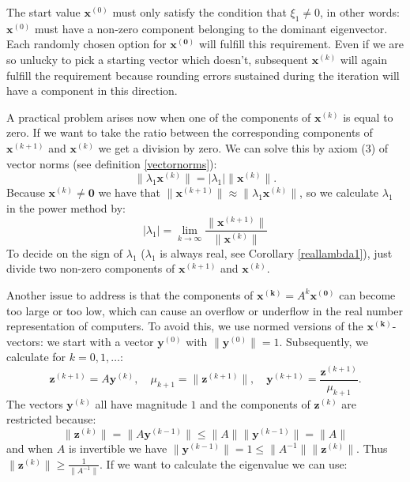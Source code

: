 \documentclass[a4paper,11pt]{report}
\begin{document}
The start value $\mathbf{x}^{(0)}$ must only satisfy the condition that $\xi_1 \not = 
0$, in other words: $\mathbf{x}^{(0)}$ must have a non-zero component belonging to the 
dominant eigenvector. Each randomly chosen option for  $\mathbf{x^{(0)}}$ 
will fulfill this requirement. Even if we are so unlucky to pick a starting 
vector which doesn't, subsequent $\mathbf{x}^{(k)}$ will again fulfill the 
requirement
because rounding errors sustained during the iteration will have a component in 
this direction.

A practical problem arises now when one of the components of $\mathbf{x}^{(k)}$ 
is equal to zero. If we want to take the ratio between the corresponding 
components of $\mathbf{x}^{(k+1)}$ and $\mathbf{x}^{(k)}$ we get a division by 
zero. We can solve this by axiom (3) of vector norms (see definition \ref{vectornorms}): 
$$\|\lambda_1\mathbf{x}^{(k)}\| = |\lambda_1|\|\mathbf{x}^{(k)}\|.$$
Because $\mathbf{x}^{(k)} \not = \mathbf{0}$ we have that $\|\mathbf{x}^{(k+1)}\| \approx \|\lambda_1\mathbf{x}^{(k)}\|$, 
so we calculate
$\lambda_1$ in the power method by:
$$|\lambda_1| = \lim_{k\to\infty}\frac{\|\mathbf{x}^{(k+1)}\|}{\|\mathbf{x}^{(k)}\| }$$
To decide on the sign of $\lambda_1$ ($\lambda_1$ is always real, see Corollary \ref{reallambda1}), just divide two non-zero components of $\mathbf{x}^{(k+1)}$ and 
$\mathbf{x}^{(k)}$.

Another issue to address is that the components of $\mathbf{x^{(k)}} = A^k\mathbf{x^{(0)}}$ 
can become too large or too low, which can cause an overflow or underflow in the 
real number representation of computers. To avoid this, we use 
normed versions of the $\mathbf{x^{(k)}}$-vectors: we start with a vector $\mathbf{y}^{(0)}$ 
with $\|\mathbf{y}^{(0)}\|=1$. Subsequently, we calculate for $k = 0, 1, 
\ldots$:
$$\mathbf{z}^{(k+1)} = A\mathbf{y}^{(k)}, \quad \mu_{k+1} = \|\mathbf{z}^{(k+1)}\|, \quad \mathbf{y}^{(k+1)}=
\frac{\mathbf{z}^{(k+1)}}{\mu_{k+1}}.$$ 
The vectors $\mathbf{y}^{(k)}$ all have magnitude $1$ and the components of $\mathbf{z}^{(k)}$ 
are restricted because:
$$\|\mathbf{z}^{(k)}\| = \|A\mathbf{y}^{(k-1)}\| \leq \|A\| 
\|\mathbf{y}^{(k-1)}\| = \|A\|$$
and when $A$ is invertible we have $\|\mathbf{y}^{(k-1)}\| = 1 \leq \|A^{-1}\|\|\mathbf{z}^{(k)}\|.$ 
Thus $\|\mathbf{z}^{(k)}\| \geq \frac{1}{\|A^{-1}\|}$.
If we want to calculate the eigenvalue we can use:
\end{document}
